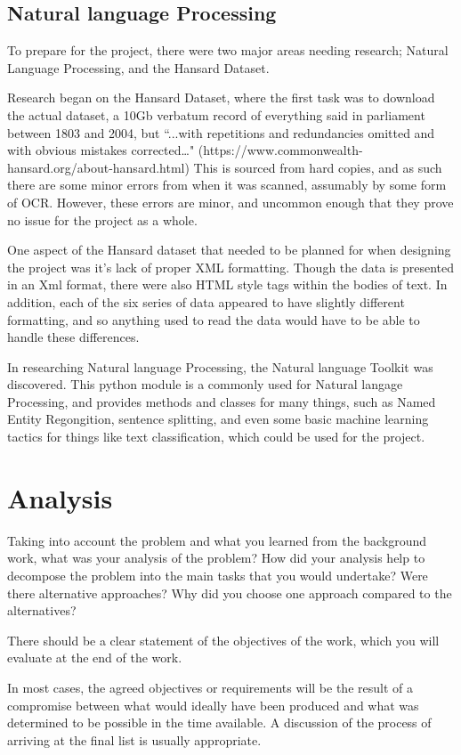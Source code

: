 \subsection{Natural language Processing}
To prepare for the project, there were two major areas needing research; Natural Language Processing, and the Hansard Dataset.

Research began on the Hansard Dataset, where the first task was to download the actual dataset, a 10Gb verbatum record of everything said in parliament between 1803 and 2004, but “...with repetitions and redundancies omitted and with obvious mistakes corrected…" (https://www.commonwealth-hansard.org/about-hansard.html)
This is sourced from hard copies, and as such there are some minor errors from when it was scanned, assumably by some form of OCR. However, these errors are minor, and uncommon enough that they prove no issue for the project as a whole.

One aspect of the Hansard dataset that needed to be planned for when designing the project was it’s lack of proper XML formatting. Though the data is presented in an Xml format, there were also HTML style tags within the bodies of text. In addition, each of the six series of data appeared to have slightly different formatting, and so anything used to read the data would have to be able to handle these differences.

In researching Natural language Processing, the Natural language Toolkit was discovered. This python module is a commonly used for Natural langage Processing, and provides methods and classes for many things, such as Named Entity Regongition, sentence splitting, and even some basic machine learning tactics for things like text classification, which could be used for the project. 

\section{Analysis}
Taking into account the problem and what you learned from the background work, what was your analysis of the problem? How did your analysis help to decompose the problem into the main tasks that you would undertake? Were there alternative approaches? Why did you choose one approach compared to the alternatives? 

There should be a clear statement of the objectives of the work, which you will evaluate at the end of the work. 

In most cases, the agreed objectives or requirements will be the result of a compromise between what would ideally have been produced and what was determined to be possible in the time available. A discussion of the process of arriving at the final list is usually appropriate.

